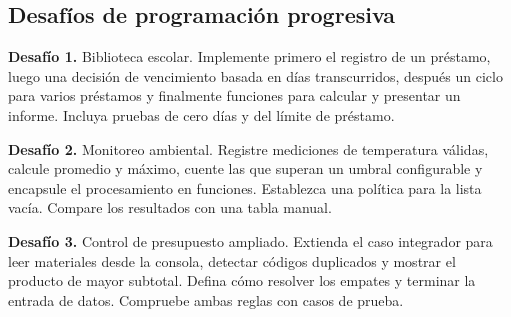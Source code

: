\subsection{Desafíos de programación progresiva}

\textbf{Desafío 1.} Biblioteca escolar. Implemente primero el registro de un préstamo, luego una decisión de vencimiento basada en días transcurridos, después un ciclo para varios préstamos y finalmente funciones para calcular y presentar un informe. Incluya pruebas de cero días y del límite de préstamo.

\textbf{Desafío 2.} Monitoreo ambiental. Registre mediciones de temperatura válidas, calcule promedio y máximo, cuente las que superan un umbral configurable y encapsule el procesamiento en funciones. Establezca una política para la lista vacía. Compare los resultados con una tabla manual.

\textbf{Desafío 3.} Control de presupuesto ampliado. Extienda el caso integrador para leer materiales desde la consola, detectar códigos duplicados y mostrar el producto de mayor subtotal. Defina cómo resolver los empates y terminar la entrada de datos. Compruebe ambas reglas con casos de prueba.
